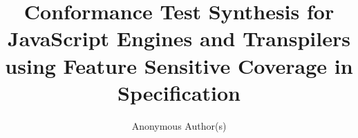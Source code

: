 \documentclass[acmsmall,screen]{acmart}
\begin{document}
\title{Conformance Test Synthesis for JavaScript Engines and Transpilers
using Feature Sensitive Coverage in Specification}

\author{Anonymous Author(s)}

%
%
%



%

\maketitle












\balance

\end{document}
